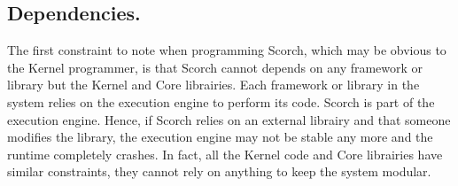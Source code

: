 \documentclass[a4paper,12pt,twoside]{../includes/ThesisStyle}
\begin{document}




\subsection{Dependencies.} 

The first constraint to note when programming Scorch, which may be obvious to the Kernel programmer, is that Scorch cannot depends on any framework or library but the Kernel and Core librairies. Each framework or library in the system relies on the execution engine to perform its code. Scorch is part of the execution engine. Hence, if Scorch relies on an external librairy and that someone modifies the library, the execution engine may not be stable any more and the runtime completely crashes. In fact, all the Kernel code and Core librairies have similar constraints, they cannot rely on anything to keep the system modular. 
\end{document}
